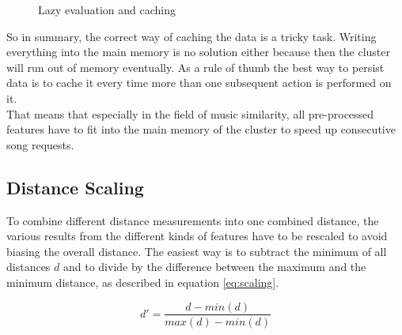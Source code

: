 \begin{figure}[htbp]
	\centering
	\caption{Lazy evaluation and caching}
	\label{lazcach}
\end{figure}
\FloatBarrier

\noindent So in summary, the correct way of caching the data is a tricky task. Writing everything into the main memory is no solution either because then the cluster will run out of memory eventually. As a rule of thumb the best way to persist data is to cache it every time more than one subsequent action is performed on it.\\
That means that especially in the field of music similarity, all pre-processed features have to fit into the main memory of the cluster to speed up consecutive song requests. 

\subsection{Distance Scaling}\label{distsc}

To combine different distance measurements into one combined distance, the various results from the different kinds of features have to be rescaled to avoid biasing the overall distance.
The easiest way is to subtract the minimum of all distances $d$ and to divide by the difference between the maximum and the minimum distance, as described in equation \ref{eq:scaling}. 

\begin{equation} \label{eq:scaling}
d' = \frac{d - min(d)}{max(d) - min(d)}
\end{equation}

